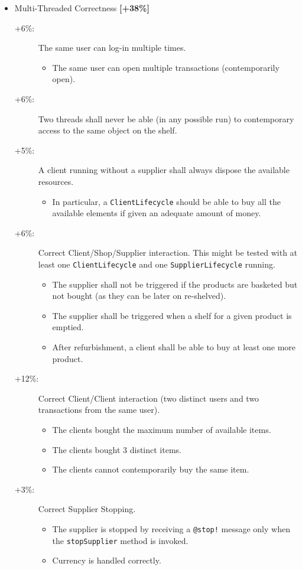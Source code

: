\documentclass{article}
\begin{document}
\begin{itemize}
	\item  Multi-Threaded Correctness \textbf{[+38\%]}
\begin{description}
	\item [+6\%:] The same user can log-in multiple times.
\begin{itemize}
\item The same user can open multiple transactions (contemporarily open).
\end{itemize}
\item [+6\%: ] Two threads shall never be able (in any possible run) to contemporary access to the same object on the shelf.
\item [+5\%: ] A client running without a supplier shall always dispose the available resources.
\begin{itemize}
\item In particular, a \texttt{ClientLifecycle} should be able to buy all the available elements if given an adequate amount of money.
\end{itemize}
\item [+6\%: ] Correct Client/Shop/Supplier interaction. This might be tested with at least one \texttt{ClientLifecycle} and one \texttt{SupplierLifecycle} running.
\begin{itemize}
\item The supplier shall not be triggered if the products are basketed but not bought (as they can be later on re-shelved).
\item The supplier shall be triggered when a shelf for a given product is emptied.
\item After refurbishment, a client shall be able to buy at least one more product.  
\end{itemize}
\item [+12\%: ] Correct Client/Client interaction (two distinct users and two transactions from the same user).
\begin{itemize}
\item The clients bought the maximum number of available items.
\item The clients bought 3 distinct items.
\item The clients cannot contemporarily buy the same item.
\end{itemize}
\item [+3\%: ] Correct Supplier Stopping.
\begin{itemize}
\item The supplier is stopped by receiving a \texttt{@stop!} message only when the \texttt{stopSupplier} method is invoked. 
\item Currency is handled correctly.
\end{itemize}
\end{description}



\end{itemize}
\end{document}
